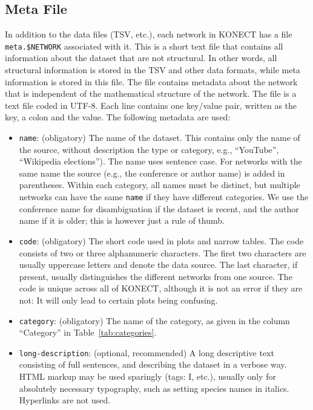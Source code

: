 \documentclass{article}
\begin{document}
\subsection{Meta File}
In addition to the data files (TSV, etc.), each network in KONECT has a
file \texttt{meta.\$NETWORK} associated with it.  This is a short text
file that contains all information about the dataset that are not
structural.  In other words, all structural information is stored in the
TSV and other data formats, while meta information is stored in this
file. 
The file contains metadata about the
network that is independent of the mathematical structure of the
network.  
The file is a text file coded in UTF-8.  Each line
contains one key/value pair, written as the key, a colon and the
value.  The following metadata are used:
\begin{itemize}
\item \texttt{name}: (obligatory) The name of the dataset.  This contains only the
  name of the source, without description the type or category,
  e.g., ``YouTube'', ``Wikipedia elections'').  The name uses
  sentence case.  For networks with the same name the source (e.g.,
  the conference or author name) is added in parentheses.  Within each category,
  all names must be distinct, but multiple networks can have the same
  \texttt{name} if they have different categories.  We use the
  conference name for disambiguation if the dataset is recent, and the
  author name if it is older; this is however just a rule of thumb. 
\item \texttt{code}: (obligatory) The short code used in plots and narrow
  tables.  The code consists of two or three alphanumeric characters.  The first
  two characters are usually uppercase letters and denote the data
  source.  The last character, if present, usually distinguishes
  the different networks from one source.  The code is unique across all
  of KONECT, although it is not an error if they are not:  It will only
  lead to certain plots being confusing. 
\item \texttt{category}: (obligatory) The name of the category, as given in the
  column ``Category'' in Table~\ref{tab:categories}.
\item \texttt{long-description}: (optional, recommended) A long descriptive
  text consisting of full sentences, and describing the dataset in
  a verbose way.  HTML markup may be used sparingly (tags: I,
  etc.), usually only for absolutely necessary typography, such as
  setting species names in italics.  Hyperlinks are not used. 

\end{itemize}
\end{document}
